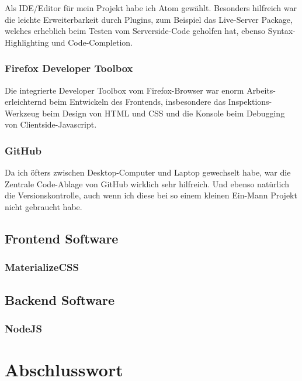 \documentclass[12pt]{scrartcl}
\begin{document}
			Als IDE/Editor für mein Projekt habe ich Atom gewählt. Besonders hilfreich war die leichte  Erweiterbarkeit durch Plugins, zum Beispiel das Live-Server Package, welches erheblich beim Testen vom Serverside-Code geholfen hat, ebenso Syntax-Highlighting und Code-Completion.
		
		\subsubsection{Firefox Developer Toolbox}
		
			Die integrierte Developer Toolbox vom Firefox-Browser war enorm Arbeits-erleichternd beim Entwickeln des Frontends, insbesondere das Inspektions-Werkzeug beim Design von HTML und CSS und die Konsole beim Debugging von Clientside-Javascript.
		
		\subsubsection{GitHub}
		
			Da ich öfters zwischen Desktop-Computer und Laptop gewechselt habe, war die Zentrale Code-Ablage von GitHub wirklich sehr hilfreich. Und ebenso natürlich die Versionskontrolle, auch wenn ich diese bei so einem kleinen Ein-Mann Projekt nicht gebraucht habe.
		
	\subsection{Frontend Software}
	
		\subsubsection{MaterializeCSS}
		
	\subsection{Backend Software}
	
		\subsubsection{NodeJS}

\section{Abschlusswort}
\end{document}
